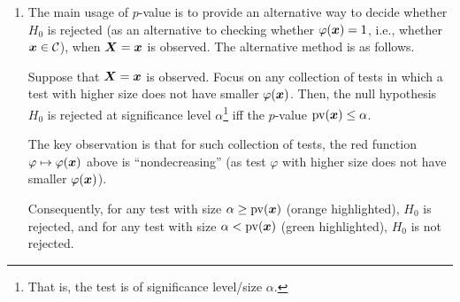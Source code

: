 \begin{enumerate}
\item The main usage of \(p\)-value is to provide an alternative way to decide
whether \(H_0\) is rejected (as an alternative to checking whether
\(\varphi(\vb*{x})=1\), i.e., whether \(\vb*{x}\in\mathcal{C}\)), when
\(\vb*{X}=\vb*{x}\) is observed. The alternative method is as follows.
\begin{proposition}
\label{prp:p-val-decision}
Suppose that \(\vb*{X}=\vb*{x}\) is observed.  Focus on any collection of tests
in which a test with higher size does not have smaller \(\varphi(\vb*{x})\).
Then, the null hypothesis \(H_0\) is rejected at significance level
\(\alpha\)\footnote{That is, the test is of significance level/size
\(\alpha\).} iff the \(p\)-value \(\operatorname{pv}(\vb*{x})\le\alpha\).
\end{proposition}
\begin{pf}
\begin{center}
\end{center}
The key observation is that for such collection of tests, the {\color{red}red}
function \(\varphi\mapsto\varphi(\vb*{x})\) above is ``nondecreasing'' (as test
\(\varphi\) with higher size does not have smaller \(\varphi(\vb*{x})\)).

Consequently, for any test with size
\(\alpha\ge\operatorname{pv}(\vb*{x})\) ({\color{orange}orange} highlighted),
\(H_0\) is rejected, and for any test with size
\(\alpha<\operatorname{pv}(\vb*{x})\) ({\color{green}green} highlighted),
\(H_0\) is not rejected.

\end{pf}


\end{enumerate}
